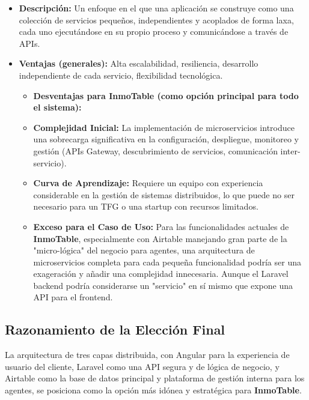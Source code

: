 \begin{enumerate}
    \begin{itemize}
        \item \textbf{Descripción:} Un enfoque en el que una aplicación se construye como una colección de servicios pequeños, independientes y acoplados de forma laxa, cada uno ejecutándose en su propio proceso y comunicándose a través de APIs.
        \item \textbf{Ventajas (generales):} Alta escalabilidad, resiliencia, desarrollo independiente de cada servicio, flexibilidad tecnológica.
        \begin{itemize}
            \item \textbf{Desventajas para InmoTable (como opción principal para todo el sistema):}
            \item \textbf{Complejidad Inicial:} La implementación de microservicios introduce una sobrecarga significativa en la configuración, despliegue, monitoreo y gestión (APIs Gateway, descubrimiento de servicios, comunicación inter-servicio).
            \item \textbf{Curva de Aprendizaje:} Requiere un equipo con experiencia considerable en la gestión de sistemas distribuidos, lo que puede no ser necesario para un TFG o una startup con recursos limitados.
            \item \textbf{Exceso para el Caso de Uso:} Para las funcionalidades actuales de \textbf{InmoTable}, especialmente con Airtable manejando gran parte de la "micro-lógica" del negocio para agentes, una arquitectura de microservicios completa para cada pequeña funcionalidad podría ser una exageración y añadir una complejidad innecesaria. Aunque el Laravel backend podría considerarse un "servicio" en sí mismo que expone una API para el frontend.
        \end{itemize}
    \end{itemize}
\end{enumerate}


\subsection{Razonamiento de la Elección Final}


La arquitectura de tres capas distribuida, con Angular para la experiencia de usuario del cliente, Laravel como una API segura y de lógica de negocio, y Airtable como la base de datos principal y plataforma de gestión interna para los agentes, se posiciona como la opción más idónea y estratégica para \textbf{InmoTable}.

